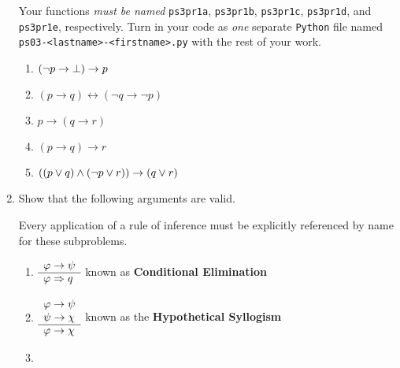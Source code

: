 \begin{enumerate}
        Your functions \emph{must be named}
        \texttt{ps3pr1a},
        \texttt{ps3pr1b},
        \texttt{ps3pr1c},
        \texttt{ps3pr1d},
        and \texttt{ps3pr1e}, respectively.
        Turn in your code as \emph{one} separate \texttt{Python} file
        named \texttt{ps03-<lastname>-<firstname>.py}
        with the rest of your work.
        \begin{enumerate}
            \item
                \(\pn*{\neg p \rightarrow \bot} \rightarrow p\)
            \item
                \((p \rightarrow q) \leftrightarrow (\neg q \rightarrow \neg p)\)
            \item
                \(p \rightarrow (q \rightarrow r)\)
            \item
                \((p \rightarrow q) \rightarrow r\)
            \item
                \(\pn*{(p \join q) \meet (\neg p \join r)} \rightarrow (q \join r)\)
        \end{enumerate}
    \item
        Show that the following arguments are valid.
        \begin{remark}
            Every application of a rule of inference must be explicitly referenced by name for these subproblems.
        \end{remark}
        \begin{enumerate}
            \item
                \(
                    \begin{array}{l}
                        \varphi \rightarrow \psi \\
                        \cline{1-1}
                        \varphi \implies q
                    \end{array}
                \)
                \hfill known as \textbf{Conditional Elimination}
            \item
                \(
                    \begin{array}{l}
                        \varphi \rightarrow \psi \\
                        \psi \rightarrow \chi \\
                        \cline{1-1}
                        \varphi \rightarrow \chi
                    \end{array}
                \)
                \hfill known as the \textbf{Hypothetical Syllogism}
            \item

\end{enumerate}
\end{enumerate}
